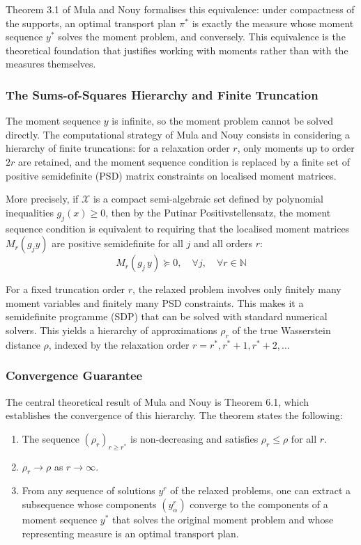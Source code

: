 \documentclass[12pt]{article}
\begin{document}
Theorem 3.1 of Mula and Nouy formalises this equivalence: under compactness of the
supports, an optimal transport plan $\pi^*$ is exactly the measure whose moment
sequence $y^*$ solves the moment problem, and conversely. This equivalence is the
theoretical foundation that justifies working with moments rather than with the
measures themselves.

\subsubsection{The Sums-of-Squares Hierarchy and Finite Truncation}

The moment sequence $y$ is infinite, so the moment problem cannot be solved directly.
The computational strategy of Mula and Nouy consists in considering a hierarchy of
finite truncations: for a relaxation order $r$, only moments up to order $2r$ are
retained, and the moment sequence condition is replaced by a finite set of
positive semidefinite (PSD) matrix constraints on localised moment matrices.

More precisely, if $\mathcal{X}$ is a compact semi-algebraic set defined by
polynomial inequalities $g_j(x) \geq 0$, then by the Putinar Positivstellensatz,
the moment sequence condition is equivalent to requiring that the localised moment
matrices $M_r(g_j y)$ are positive semidefinite for all $j$ and all orders $r$:
\begin{equation}
    M_r(g_j \, y) \succeq 0, \quad \forall j, \quad \forall r \in \mathbb{N}
\end{equation}

For a fixed truncation order $r$, the relaxed problem involves only finitely many
moment variables and finitely many PSD constraints. This makes it a semidefinite
programme (SDP) that can be solved with standard numerical solvers. This yields a
hierarchy of approximations $\rho_r$ of the true Wasserstein distance $\rho$,
indexed by the relaxation order $r = r^*, r^*+1, r^*+2, \ldots$

\subsubsection{Convergence Guarantee}

The central theoretical result of Mula and Nouy is Theorem 6.1, which establishes
the convergence of this hierarchy. The theorem states the following:
\begin{enumerate}
    \item The sequence $(\rho_r)_{r \geq r^*}$ is non-decreasing and satisfies
          $\rho_r \leq \rho$ for all $r$.
    \item $\rho_r \to \rho$ as $r \to \infty$.
    \item From any sequence of solutions $y^r$ of the relaxed problems, one can
          extract a subsequence whose components $(y^r_\alpha)$ converge to the
          components of a moment sequence $y^*$ that solves the original moment
          problem and whose representing measure is an optimal transport plan.
\end{enumerate}
\end{document}
